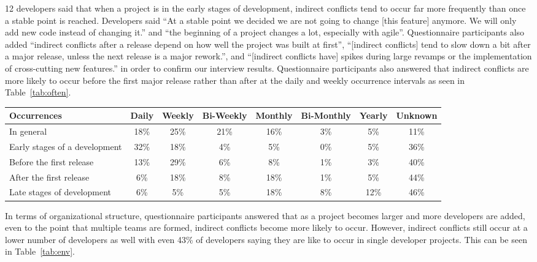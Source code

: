 \documentclass[conference]{IEEEtran}
\begin{document}
12 developers said that
when a project is in the early stages of development, indirect conflicts tend to occur far more frequently
than once a stable point is reached. Developers said ``At a stable point we decided we are not going to change
[this feature] anymore. We will only add new code instead of changing it.'' and ``the beginning of a project
changes a lot, especially with agile''. Questionnaire participants also added ``indirect conflicts after a release
depend on how well the project was built at first'', ``[indirect conflicts] tend to slow down a bit after a
major release, unless the next release is a major rework.'', and ``[indirect conflicts have] spikes during
large revamps or the implementation of cross-cutting new features.'' in order to confirm our interview results.
Questionnaire participants also answered that
indirect conflicts are more likely to occur before the first major release rather than after at the daily
and weekly occurrence intervals as seen in Table~\ref{tab:often}.

\begin{table*}[tb!]
\begin{center}
\begin{tabular}{| p{7cm} | c | c | c | c | c | c | c |}
\hline
Occurrences & Daily & Weekly & Bi-Weekly & Monthly & Bi-Monthly & Yearly & Unknown \\
\hline
\hline
In general & 18\% & 25\% & 21\% & 16\% & 3\% & 5\% & 11\% \\ \hline
Early stages of a development & 32\% & 18\% & 4\% & 5\% & 0\% & 5\% & 36\% \\ \hline
Before the first release & 13\% & 29\% & 6\% & 8\% & 1\% & 3\% & 40\% \\ \hline
After the first release & 6\% & 18\% & 8\% & 18\% & 1\% & 5\% & 44\% \\ \hline
Late stages of development & 6\% & 5\% & 5\% & 18\% & 8\% & 12\% & 46\% \\ \hline
\end{tabular}
\end{center}
\caption{Results of questionnaire as to how often indirect conflicts occur, in terms of percentage
of questionnaire participants.\label{tab:often}}
\end{table*}

In terms of organizational structure, questionnaire participants answered that as a project becomes larger and more
developers are added, even to the point that multiple teams are formed, indirect conflicts become more likely to
occur. However, indirect conflicts still occur at a lower number of developers as well with even 43\% of developers
saying they are like to occur in single developer projects. This can be seen in Table~\ref{tab:env}.
\end{document}
